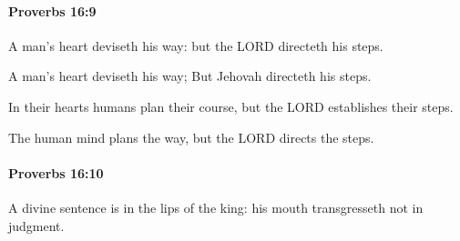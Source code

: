 		\paragraph{Proverbs 16:9} %
			\label{PROVERBS-16-9}

			A man’s heart deviseth his way: but the LORD directeth his steps.

			\begin{versebox}
					\item[BHS] 
					\item[ASV] A man's heart deviseth his way; But Jehovah directeth his steps.
					\item[NIV] In their hearts humans plan their course, but the LORD establishes their steps.
					\item[NRSV] The human mind plans the way, but the LORD directs the steps.
			\end{versebox}

		\paragraph{Proverbs 16:10} %
			\label{PROVERBS-16-10}

			A divine sentence is in the lips of the king: his mouth transgresseth not in judgment.

